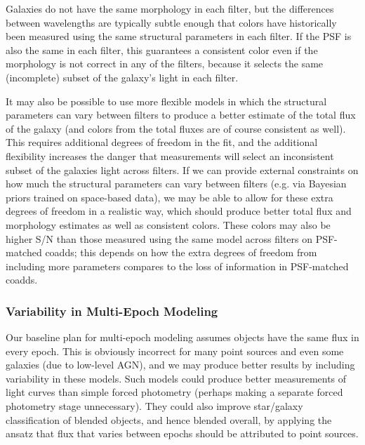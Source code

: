 \documentclass[10pt]{article}
\begin{document}
\label{sec:consistent-galaxy-colors}

Galaxies do not have the same morphology in each filter, but the differences
between wavelengths are typically subtle enough that colors have historically
been measured using the same structural parameters in each filter. If the PSF
is also the same in each filter, this guarantees a consistent color even if
the morphology is not correct in any of the filters, because it selects the
same (incomplete) subset of the galaxy's light in each filter.

It may also be possible to use more flexible models in which the structural
parameters can vary between filters to produce a better estimate of the total
flux of the galaxy (and colors from the total fluxes are of course consistent
as well).  This requires additional degrees of freedom in the fit, and the
additional flexibility increases the danger that measurements will select an
inconsistent subset of the galaxies light across filters.  If we can provide
external constraints on how much the structural parameters can vary between
filters (e.g. via Bayesian priors trained on space-based data), we may be able
to allow for these extra degrees of freedom in a realistic way, which should
produce better total flux and morphology estimates as well as consistent
colors.  These colors may also be higher S/N than those measured using the
same model across filters on PSF-matched coadds; this depends on how
the extra degrees of freedom from including more parameters compares to the
loss of information in PSF-matched coadds.

\subsubsection{Variability in Multi-Epoch Modeling}

\label{sec:variable-models}

Our baseline plan for multi-epoch modeling assumes objects have the same flux
in every epoch.  This is obviously incorrect for many point sources and even
some galaxies (due to low-level AGN), and we may produce better results by
including variability in these models.  Such models could produce better
measurements of light curves than simple forced photometry (perhaps making a
separate forced photometry stage unnecessary). They could also improve
star/galaxy classification of blended objects, and hence blended overall,
by applying the ansatz that flux that varies between epochs should be
attributed to point sources.
\end{document}
